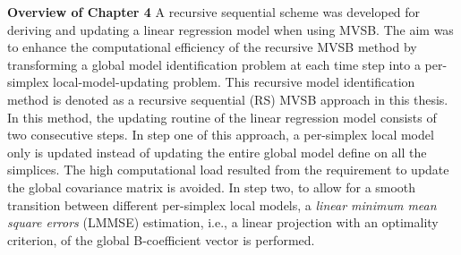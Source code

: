\noindent \textbf{Overview of Chapter 4} A recursive sequential scheme was developed for deriving and updating a linear regression model when using \ac{MVSB}. The aim was to enhance the computational efficiency of the recursive \ac{MVSB} method by transforming a global model identification problem at each time step into a per-simplex local-model-updating problem. This recursive model identification method is denoted as a recursive sequential (RS) \ac{MVSB} approach in this thesis. In this method, the updating routine of the linear regression model consists of two consecutive steps. In step one of this approach, a per-simplex local model only is updated instead of updating the entire global model define on all the simplices. The high computational load resulted from the requirement to update the global covariance matrix is avoided. In step two, to allow for a smooth transition between different per-simplex local models, a \textit{linear minimum mean square errors} (LMMSE) estimation, i.e., a linear projection with an optimality criterion, of the global B-coefficient vector is performed.\\

